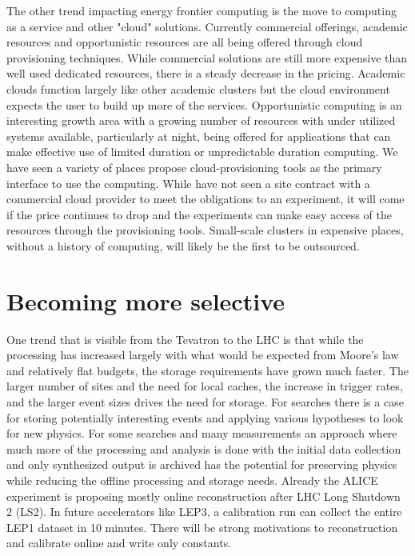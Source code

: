 The other trend impacting energy frontier computing is the move to
computing as a service and other "cloud" solutions.  Currently
commercial offerings, academic resources and opportunistic resources
are all being offered through cloud provisioning techniques.  While
commercial solutions are still more expensive than well used dedicated
resources, there is a steady decrease in the pricing.  Academic clouds
function largely like other academic clusters but the cloud
environment expects the user to build up more of the services.
Opportunistic computing is an interesting growth area with a growing
number of resources with under utilized systems available,
particularly at night, being offered for applications that can make
effective use of limited duration or unpredictable duration computing.
We have seen a variety of places propose cloud-provisioning tools as
the primary interface to use the computing. While have not seen a site
contract with a commercial cloud provider to meet the obligations to
an experiment, it will come if the price continues to drop and the
experiments can make easy access of the resources through the
provisioning tools.  Small-scale clusters in expensive places, without
a history of computing, will likely be the first to be outsourced.

\section{Becoming more selective}
\label{sec:comp-select}

One trend that is visible from the Tevatron to the LHC is that while
the processing has increased largely with what would be expected from
Moore's law and relatively flat budgets, the storage requirements have
grown much faster.  The larger number of sites and the need for local
caches, the increase in trigger rates, and the larger event sizes
drives the need for storage.  For searches there is a case for storing
potentially interesting events and applying various hypotheses to look
for new physics.  For some searches and many measurements an approach
where much more of the processing and analysis is done with the
initial data collection and only synthesized output is archived has
the potential for preserving physics while reducing the offline
processing and storage needs.  Already the ALICE experiment is
proposing mostly online reconstruction after LHC Long Shutdown 2
(LS2).  In future accelerators like LEP3, a calibration run can
collect the entire LEP1 dataset in 10 minutes.  There will be strong
motivations to reconstruction and calibrate online and write only
constants.

